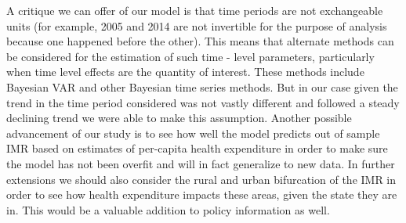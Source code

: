 \documentclass{article}
\begin{document}
A critique we can offer of our model is that time periods are not exchangeable units (for example, 2005 and 2014 are not invertible for the purpose of analysis because one happened before the other). This means that alternate methods can be considered for the estimation of such time - level parameters, particularly when time level effects are the quantity of interest. These methods include Bayesian VAR and other Bayesian time series methods. But in our case given the trend in the time period considered was not vastly different and followed a steady declining trend we were able to make this assumption. Another possible advancement of our study is to see how well the model predicts out of sample IMR based on estimates of per-capita health expenditure in order to make sure the model has not been overfit and will in fact generalize to new data. In further extensions we should also consider the rural and urban bifurcation of the IMR in order to see how health expenditure impacts these areas, given the state they are in. This would be a valuable addition to policy information as well.\\
\end{document}
